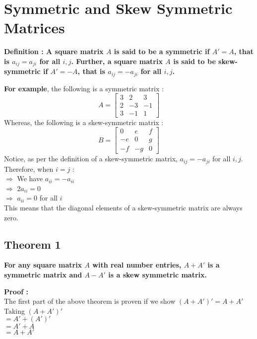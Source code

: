 \documentclass[12pt, letterpaper]{article}
\begin{document}
\section{Symmetric and Skew Symmetric Matrices}
\begin{displayquote}
\textbf{Definition : A square matrix $A$ is said to be a symmetric if $A' = A$, that is $a_{ij} = a_{ji}$ for all $i,j$. Further, a square matrix $A$ is said to be skew-symmetric if $A' = -A$, that is $a_{ij} = -a_{ji}$ for all $i,j$.}
\end{displayquote}
\textbf{For example}, the following is a symmetric matrix : 
\begin{displaymath}
A = \begin{bmatrix}
3 & 2 & 3\\
2 & -3 & -1\\
3 & -1 & 1
\end{bmatrix}
\end{displaymath}
Whereas, the following is a skew-symmetric matrix : 
\begin{displaymath}
B = \begin{bmatrix}
0 & e & f\\
-e & 0 & g\\
-f & -g & 0
\end{bmatrix}
\end{displaymath}
Notice, as per the definition of a skew-symmetric matrix, $a_{ij} = -a_{ji}$ for all $i,j$. Therefore, when $i=j$ : \\
$\Rightarrow$ We have $a_{ii} = -a_{ii}$\\
$\Rightarrow$ $2a_{ii} = 0$\\
$\Rightarrow$ $a_{ii} = 0$ for all $i$\\
This means that the diagonal elements of a skew-symmetric matrix are always zero.

\subsection{Theorem 1}
\begin{displayquote}
\textbf{For any square matrix $A$ with real number entries, $A+A'$ is a symmetric matrix and $A-A'$ is a skew symmetric matrix.}
\end{displayquote}
\textbf{Proof :}\\
The first part of the above theorem is proven if we show $(A + A')' = A + A'$\\
Taking $(A + A')'$\\
$ = A' + (A')'$\\
$= A' + A$\\
$= A + A'$
\smallskip
\end{document}
